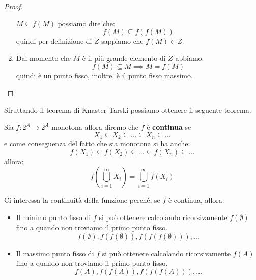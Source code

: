 \begin{teorema}
\begin{proof}
\begin{enumerate}
                  $M \subseteq f(M)$ possiamo dire che:
                  \begin{equation}
                      f(M) \subseteq f(f(M))
                  \end{equation}
                  quindi per definizione di $Z$ sappiamo che $f(M)\in Z$.
            \item Dal momento che $M$ è il più grande elemento di $Z$ abbiamo:
                  \begin{equation}
                    f(M) \subseteq M \implies M = f(M)
                  \end{equation}
                  quindi è un punto fisso, inoltre, è il punto fisso massimo.
        \end{enumerate}
    \end{proof}
\end{teorema}
Sfruttando il teorema di Knaster-Tarski possiamo ottenere il seguente teorema:
\begin{teorema}
    Sia $f:2^A \to 2^A$ monotona allora diremo che $f$ è \textbf{continua} se
    \begin{equation}
        X_1 \subseteq X_2 \subseteq \dots \subseteq X_n \subseteq \dots
    \end{equation}
    e come conseguenza del fatto che sia monotona si ha anche:
    \begin{equation}
        f(X_1) \subseteq f(X_2) \subseteq \dots \subseteq f(X_n) \subseteq \dots
    \end{equation}
    allora:
    \begin{equation}
        f(\bigcup_{i=1}^{\infty} X_i) = \bigcup_{i=1}^{\infty} f(X_i)
    \end{equation}
\end{teorema}
Ci interessa la continuità della funzione perché, se $f$ è continua, allora:
\begin{itemize}
    \item Il minimo punto fisso di $f$ si può ottenere calcolando ricorsivamente
          $f(\emptyset)$ fino a quando non troviamo il primo punto fisso.
          \begin{equation}
              f(\emptyset), f(f(\emptyset)), f(f(f(\emptyset))), \dots
          \end{equation}
    \item Il massimo punto fisso di $f$ si può ottenere calcolando ricorsivamente
          $f(A)$ fino a quando non troviamo il primo punto fisso.
          \begin{equation}
              f(A), f(f(A)), f(f(f(A))), \dots
          \end{equation}
\end{itemize}
